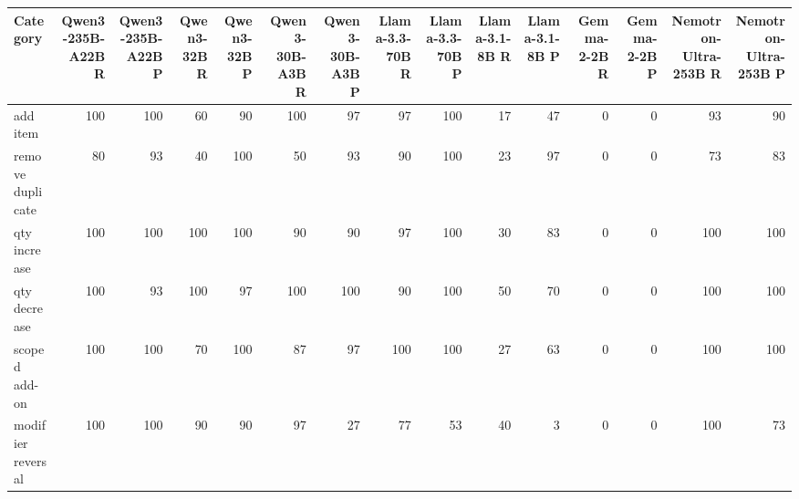 \begin{tabular}{lrrrrrrrrrrrrrr}
\toprule
Category & Qwen3-235B-A22B R & Qwen3-235B-A22B P & Qwen3-32B R & Qwen3-32B P & Qwen3-30B-A3B R & Qwen3-30B-A3B P & Llama-3.3-70B R & Llama-3.3-70B P & Llama-3.1-8B R & Llama-3.1-8B P & Gemma-2-2B R & Gemma-2-2B P & Nemotron-Ultra-253B R & Nemotron-Ultra-253B P \\
\midrule
add item & \cellcolor[gray]{0.65}100 & \cellcolor[gray]{0.65}100 & \cellcolor[gray]{0.79}60 & \cellcolor[gray]{0.69}90 & \cellcolor[gray]{0.65}100 & \cellcolor[gray]{0.66}97 & \cellcolor[gray]{0.66}97 & \cellcolor[gray]{0.65}100 & \cellcolor[gray]{0.94}17 & \cellcolor[gray]{0.84}47 & \cellcolor[gray]{1.00}0 & \cellcolor[gray]{1.00}0 & \cellcolor[gray]{0.67}93 & \cellcolor[gray]{0.69}90 \\
remove duplicate & \cellcolor[gray]{0.72}80 & \cellcolor[gray]{0.67}93 & \cellcolor[gray]{0.86}40 & \cellcolor[gray]{0.65}100 & \cellcolor[gray]{0.82}50 & \cellcolor[gray]{0.67}93 & \cellcolor[gray]{0.69}90 & \cellcolor[gray]{0.65}100 & \cellcolor[gray]{0.92}23 & \cellcolor[gray]{0.66}97 & \cellcolor[gray]{1.00}0 & \cellcolor[gray]{1.00}0 & \cellcolor[gray]{0.74}73 & \cellcolor[gray]{0.71}83 \\
qty increase & \cellcolor[gray]{0.65}100 & \cellcolor[gray]{0.65}100 & \cellcolor[gray]{0.65}100 & \cellcolor[gray]{0.65}100 & \cellcolor[gray]{0.69}90 & \cellcolor[gray]{0.69}90 & \cellcolor[gray]{0.66}97 & \cellcolor[gray]{0.65}100 & \cellcolor[gray]{0.90}30 & \cellcolor[gray]{0.71}83 & \cellcolor[gray]{1.00}0 & \cellcolor[gray]{1.00}0 & \cellcolor[gray]{0.65}100 & \cellcolor[gray]{0.65}100 \\
qty decrease & \cellcolor[gray]{0.65}100 & \cellcolor[gray]{0.67}93 & \cellcolor[gray]{0.65}100 & \cellcolor[gray]{0.66}97 & \cellcolor[gray]{0.65}100 & \cellcolor[gray]{0.65}100 & \cellcolor[gray]{0.69}90 & \cellcolor[gray]{0.65}100 & \cellcolor[gray]{0.82}50 & \cellcolor[gray]{0.76}70 & \cellcolor[gray]{1.00}0 & \cellcolor[gray]{1.00}0 & \cellcolor[gray]{0.65}100 & \cellcolor[gray]{0.65}100 \\
scoped add-on & \cellcolor[gray]{0.65}100 & \cellcolor[gray]{0.65}100 & \cellcolor[gray]{0.76}70 & \cellcolor[gray]{0.65}100 & \cellcolor[gray]{0.70}87 & \cellcolor[gray]{0.66}97 & \cellcolor[gray]{0.65}100 & \cellcolor[gray]{0.65}100 & \cellcolor[gray]{0.91}27 & \cellcolor[gray]{0.78}63 & \cellcolor[gray]{1.00}0 & \cellcolor[gray]{1.00}0 & \cellcolor[gray]{0.65}100 & \cellcolor[gray]{0.65}100 \\
modifier reversal & \cellcolor[gray]{0.65}100 & \cellcolor[gray]{0.65}100 & \cellcolor[gray]{0.69}90 & \cellcolor[gray]{0.69}90 & \cellcolor[gray]{0.66}97 & \cellcolor[gray]{0.91}27 & \cellcolor[gray]{0.73}77 & \cellcolor[gray]{0.81}53 & \cellcolor[gray]{0.86}40 & \cellcolor[gray]{0.99}3 & \cellcolor[gray]{1.00}0 & \cellcolor[gray]{1.00}0 & \cellcolor[gray]{0.65}100 & \cellcolor[gray]{0.74}73 \\

\end{tabular}
